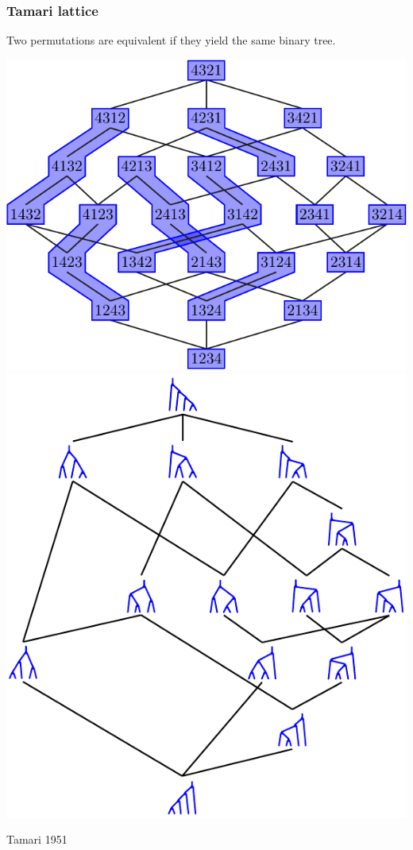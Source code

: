 \documentclass[11pt]{beamer}%
\newcommand{\green}{\color{darkgreen}}
\newcommand{\auth}[1]{{\green\hfill{\footnotesize #1}}}
\begin{document}
\begin{frame}
  \frametitle{Tamari lattice}
  Two permutations are equivalent if they yield the same binary tree. 
  \begin{center}
    \includegraphics[height=.55\textheight]{weakOrderCongruence4.pdf}
    \includegraphics[height=.55\textheight]{TamariLattice4.pdf}
  \end{center}
  \auth{Tamari 1951}
\end{frame}
\end{document}
